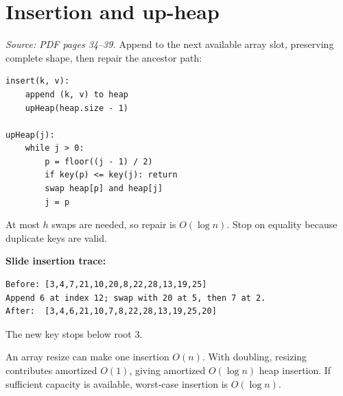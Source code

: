 \documentclass[11pt,letterpaper]{article}
\newcommand{\sourcepages}[1]{\textit{Source: PDF pages #1.}}
\begin{document}
\section{Insertion and up-heap}
\sourcepages{34--39}
Append to the next available array slot, preserving complete shape, then repair the ancestor path:
\par\noindent\begin{minipage}{\linewidth}
\begin{lstlisting}
insert(k, v):
    append (k, v) to heap
    upHeap(heap.size - 1)

upHeap(j):
    while j > 0:
        p = floor((j - 1) / 2)
        if key(p) <= key(j): return
        swap heap[p] and heap[j]
        j = p
\end{lstlisting}
\end{minipage}\par
At most $h$ swaps are needed, so repair is $O(\log n)$. Stop on equality because duplicate keys are valid.

\textbf{Slide insertion trace:}
\par\noindent\begin{minipage}{\linewidth}
\begin{lstlisting}
Before: [3,4,7,21,10,20,8,22,28,13,19,25]
Append 6 at index 12; swap with 20 at 5, then 7 at 2.
After:  [3,4,6,21,10,7,8,22,28,13,19,25,20]
\end{lstlisting}
\end{minipage}\par
The new key stops below root $3$.

An array resize can make one insertion $O(n)$. With doubling, resizing contributes amortized $O(1)$, giving amortized $O(\log n)$ heap insertion. If sufficient capacity is available, worst-case insertion is $O(\log n)$.
\end{document}
